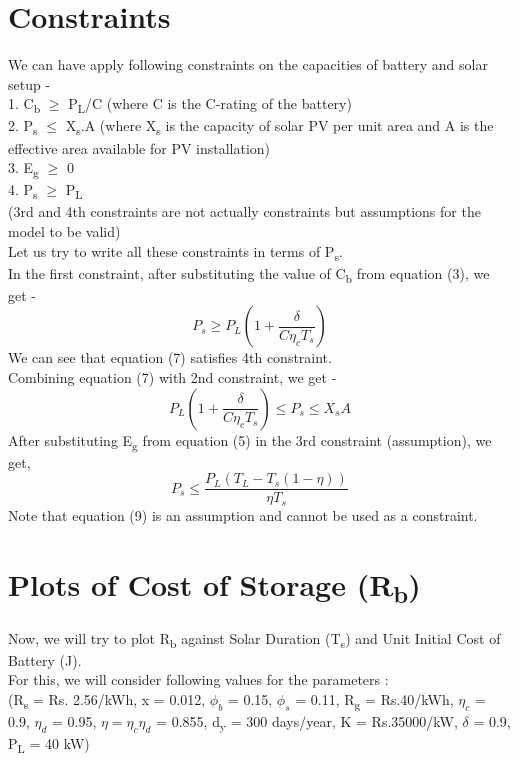 \documentclass{article}
\begin{document}
\section{Constraints}
We can have apply following constraints on the capacities of battery and solar setup -\\
1. C\textsubscript{b} \(\geq\) P\textsubscript{L}/C  (where C is the C-rating of the battery)\\
2. P\textsubscript{s} \(\leq\) X\textsubscript{s}.A  (where X\textsubscript{s} is the capacity of solar PV per unit area and A is the effective area available for PV installation)\\
3. E\textsubscript{g} \(\geq\) 0\\
4. P\textsubscript{s} \(\geq\) P\textsubscript{L}\\
(3rd and 4th constraints are not actually constraints but assumptions for the model to be valid)\\
\newline
Let us try to write all these constraints in terms of P\textsubscript{s}.\\
\newline
In the first constraint, after substituting the value of C\textsubscript{b} from equation (3),  we get -\\
\begin{equation}
 P_s \geq P_L (1 + \frac{\delta}{C \eta_c T_s})
\end{equation}
We can see that equation (7) satisfies 4th constraint.\\
\newline
Combining equation (7) with 2nd constraint, we get -\\
\begin{equation}
	P_L (1 + \frac{\delta}{C \eta_c T_s}) \leq P_s \leq X_s A
\end{equation}
\newline
After substituting E\textsubscript{g} from equation (5) in the 3rd constraint (assumption), we get,\\
\begin{equation}
	P_s \leq \frac{P_L(T_L - T_s(1 - \eta))}{\eta T_s}
\end{equation}
Note that equation (9) is an assumption and cannot be used as a constraint.\\
\newline
\section{Plots of Cost of Storage (R\textsubscript{b})}
Now, we will try to plot R\textsubscript{b} against Solar Duration (T\textsubscript{s}) and Unit Initial Cost of Battery (J).\\ 
For this, we will consider following values for the parameters :\\
(R\textsubscript{s} = Rs. 2.56/kWh,
x = 0.012,
\(\phi_b\) = 0.15,
\(\phi_s\) = 0.11,
R\textsubscript{g} = Rs.40/kWh, 
\(\eta_c\) = 0.9,
\(\eta_d\) = 0.95,
\(\eta = \eta_c \eta_d\) = 0.855,
d\textsubscript{y} = 300 days/year,
K = Rs.35000/kW,
\(\delta\) = 0.9,
P\textsubscript{L} = 40 kW)\\
\end{document}
